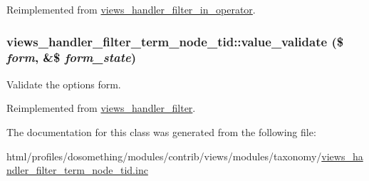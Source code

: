 Reimplemented from \hyperlink{classviews__handler__filter__in__operator_af7b01b1f4e53aec7f4b1065606819624}{views\_\-handler\_\-filter\_\-in\_\-operator}.\hypertarget{classviews__handler__filter__term__node__tid_a907bf3c6a90070dc9e9bc3e609a96888}{
\subsubsection[{value\_\-validate}]{\setlength{\rightskip}{0pt plus 5cm}views\_\-handler\_\-filter\_\-term\_\-node\_\-tid::value\_\-validate (\$ {\em form}, \/  \&\$ {\em form\_\-state})}}
\label{classviews__handler__filter__term__node__tid_a907bf3c6a90070dc9e9bc3e609a96888}
Validate the options form. 

Reimplemented from \hyperlink{classviews__handler__filter_a55b051bcd047b7251e6dbbece8e0a081}{views\_\-handler\_\-filter}.

The documentation for this class was generated from the following file:\begin{DoxyCompactItemize}
\item 
html/profiles/dosomething/modules/contrib/views/modules/taxonomy/\hyperlink{views__handler__filter__term__node__tid_8inc}{views\_\-handler\_\-filter\_\-term\_\-node\_\-tid.inc}\end{DoxyCompactItemize}
